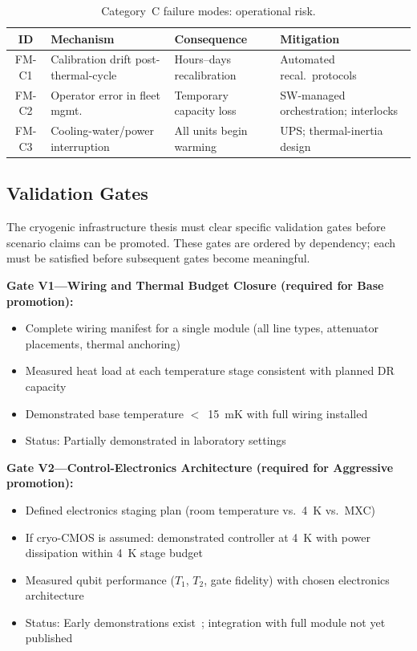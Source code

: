 \documentclass[conference]{IEEEtran}
\begin{document}
\begin{table}[H]
\centering
\caption{Category~C failure modes: operational risk.}
\label{tab:fm-c}
\footnotesize
\begin{tabularx}{\columnwidth}{cL{2.0cm}L{1.8cm}L{2.0cm}}
\toprule
\textbf{ID} & \textbf{Mechanism} & \textbf{Consequence} & \textbf{Mitigation} \\
\midrule
FM-C1 & Calibration drift post-thermal-cycle & Hours--days recalibration & Automated recal.\ protocols \\
FM-C2 & Operator error in fleet mgmt. & Temporary capacity loss & SW-managed orchestration; interlocks \\
FM-C3 & Cooling-water/power interruption & All units begin warming & UPS; thermal-inertia design \\
\bottomrule
\end{tabularx}
\end{table}

\subsection{Validation Gates}

The cryogenic infrastructure thesis must clear specific validation gates before scenario claims can be promoted. These gates are ordered by dependency; each must be satisfied before subsequent gates become meaningful.

\textbf{Gate V1---Wiring and Thermal Budget Closure (required for Base promotion):}
\begin{itemize}
\item Complete wiring manifest for a single module (all line types, attenuator placements, thermal anchoring)
\item Measured heat load at each temperature stage consistent with planned DR capacity
\item Demonstrated base temperature $<$~15~mK with full wiring installed
\item Status: Partially demonstrated in laboratory settings~\cite{Krinner2019, Hornibrook2015}
\end{itemize}

\textbf{Gate V2---Control-Electronics Architecture (required for Aggressive promotion):}
\begin{itemize}
\item Defined electronics staging plan (room temperature vs.\ 4~K vs.\ MXC)
\item If cryo-CMOS is assumed: demonstrated controller at 4~K with power dissipation within 4~K stage budget
\item Measured qubit performance ($T_1$, $T_2$, gate fidelity) with chosen electronics architecture
\item Status: Early demonstrations exist~\cite{Bardin2019, Pauka2021}; integration with full module not yet published
\end{itemize}
\end{document}

